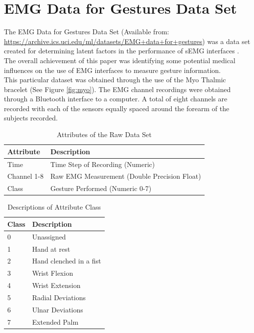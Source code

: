 \documentclass[11pt]{article}
\begin{document}
	\noindent
	
	
	
	\section{EMG Data for Gestures Data Set}
	The EMG Data for Gestures Data Set (Available from: \url{https://archive.ics.uci.edu/ml/datasets/EMG+data+for+gestures}) was a data set created for determining latent factors in the performance of sEMG interfaces \cite{Lobov2018}. The overall achievement of this paper was identifying some potential medical influences on the use of EMG interfaces to measure gesture information.\\
	
	\noindent
	This particular dataset was obtained through the use of the Myo Thalmic bracelet (See Figure \ref{fig:myo}). The EMG channel recordings were obtained through a Bluetooth interface to a computer. A total of eight channels are recorded with each of the sensors equally spaced around the forearm of the subjects recorded.\\
	
	\begin{table}[H]
		\caption{Attributes of the Raw Data Set}
		\centering
		\begin{tabular}{l|l}
			Attribute   & Description             \\\hline
			Time        & Time Step of  Recording (Numeric)\\
			Channel 1-8 & Raw EMG Measurement (Double Precision Float)     \\
			Class       & Gesture Performed (Numeric 0-7)      \\\hline\hline
		\end{tabular}
	\end{table}

\begin{table}[H]
	\caption{Descriptions of Attribute Class}
	\centering
	\begin{tabular}{l|l}
		Class & Description             \\\hline
		0     & Unassigned              \\
		1     & Hand at rest            \\
		2     & Hand clenched in a fist \\
		3     & Wrist Flexion           \\
		4     & Wrist Extension         \\
		5     & Radial Deviations       \\
		6     & Ulnar Deviations        \\
		7     & Extended Palm           \\\hline\hline
	\end{tabular}
\end{table}
	
\end{document}
